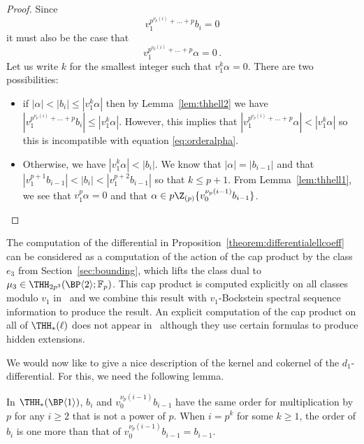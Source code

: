 \begin{proof}
  Since
  \[
    v_1^{p^{\nu_p(i)} + \dots + p } b_i = 0
  \]
  it must also be the case that
  \begin{equation} \label{eq:orderalpha}
    v_1^{p^{\nu_p(i)} + \dots + p } \alpha = 0 \,.
  \end{equation}
  Let us write $k$ for the smallest integer such that $v_1^k \alpha = 0$. There are two possibilities:
  \begin{itemize}
  \item if $ |\alpha| < |b_i| \leq |v_1^k \alpha|$ then by Lemma~\ref{lem:thhell2} we have $|v_1^{p^{\nu_p(i)} + \dots + p } b_i| \leq |v_1^k \alpha|$. However, this implies that $|v_1^{p^{\nu_p(i)} + \dots + p } \alpha | < |v_1^k \alpha|$ so this is incompatible with equation \eqref{eq:orderalpha}.
  \item Otherwise, we have $|v_1^k \alpha | < |b_i|$. We know that $|\alpha | = |b_{i-1}|$ and that $|v_1^{p+1} b_{i-1}| < |b_i| < |v_1^{p+2} b_{i-1}|$ so that $k \leq p +1$. From Lemma~\ref{lem:thhell1}, we see that $v_1^p\alpha = 0$ and that $\alpha \in p\Z_{(p)}\{ v_0^{\nu_p(i-1)}b_{i-1} \}$.
  \end{itemize}
\end{proof}

\begin{remark}
The computation of the differential in Proposition~\ref{theorem:differentialellcoeff} can be considered as a computation of the action of the cap product by the class $e_{3}$ from Section~\ref{sec:bounding}, which lifts the class dual to $\mu_3\in \THH_{2p^3}(\BP\langle 2\rangle;\mathbb{F}_p)$. This cap product is computed explicitly on all classes modulo $v_1$ in~\cite[Corollary~5.7]{AHL10} and we combine this result with $v_1$-Bockstein spectral sequence information to produce the result. An explicit computation of the cap product on all of $\THH_*(\ell)$ does not appear in~\cite{AHL09} although they use certain formulas to produce hidden extensions. 
\end{remark}

We would now like to give a nice description of the kernel and cokernel of the $d_1$-differential. For this, we need the following lemma. 

\begin{lemma} \label{lem:thhell3}
  In $\THH_*(\BP\langle 1\rangle)$, $b_i$ and $v_0^{\nu_p(i-1)} b_{i-1}$ have the same order for multiplication by $p$ for any $ i \geq 2$ that is not a power of $p$. When $i = p^k$ for some $k \geq 1$, the order of $b_i$ is one more than that of $v_0^{\nu_p(i-1)} b_{i-1} = b_{i-1}$.
\end{lemma}

